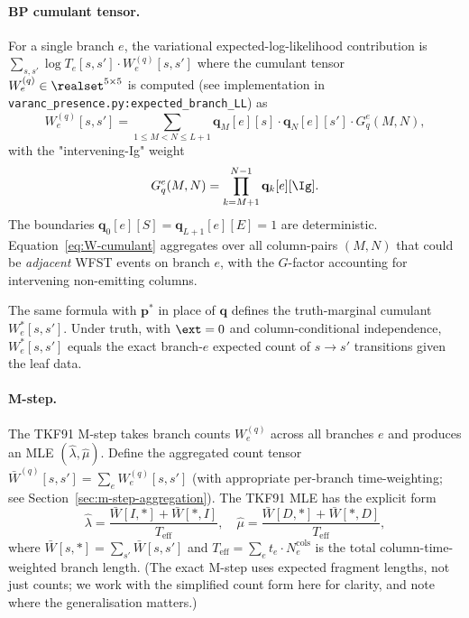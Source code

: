 \paragraph{BP cumulant tensor.}
For a single branch $e$, the variational expected-log-likelihood
contribution is $\sum_{s, s'} \log T_e[s, s'] \cdot W_e^{(q)}[s, s']$
where the cumulant tensor $W_e^{(q)} \in \realset^{5\times 5}$ is
computed (see implementation in
\texttt{varanc\_presence.py:expected\_branch\_LL}) as
\begin{equation}
\label{eq:W-cumulant}
W_e^{(q)}[s, s']
= \sum_{1 \leq M < N \leq L+1} \mathbf{q}_M[e][s] \cdot
   \mathbf{q}_N[e][s'] \cdot G_q^{e}(M, N),
\end{equation}
with the "intervening-Ig" weight
\begin{equation}
G_q^{e}(M, N) = \prod_{k = M+1}^{N-1} \mathbf{q}_k[e][\Ig].
\end{equation}
The boundaries $\mathbf{q}_0[e][S] = \mathbf{q}_{L+1}[e][E] = 1$ are
deterministic.  Equation~\eqref{eq:W-cumulant} aggregates over all
column-pairs $(M, N)$ that could be \emph{adjacent} WFST events
on branch $e$, with the $G$-factor accounting for intervening
non-emitting columns.

The same formula with $\mathbf{p}^*$ in place of $\mathbf{q}$ defines
the truth-marginal cumulant $W_e^{*}[s, s']$.  Under truth, with
$\ext = 0$ and column-conditional independence, $W_e^*[s, s']$
equals the exact branch-$e$ expected count of $s \to s'$
transitions given the leaf data.

\paragraph{M-step.}
The TKF91 M-step takes branch counts $W_e^{(q)}$ across all
branches $e$ and produces an MLE $(\hat\lambda, \hat\mu)$.  Define
the aggregated count tensor $\bar W^{(q)}[s, s'] = \sum_e
W_e^{(q)}[s, s']$ (with appropriate per-branch time-weighting; see
Section~\ref{sec:m-step-aggregation}).  The TKF91 MLE has the
explicit form
\begin{equation}
\label{eq:tkf91-mle}
\hat\lambda = \frac{\bar W[I,*] + \bar W[*,I]}{T_{\text{eff}}},
\quad
\hat\mu = \frac{\bar W[D,*] + \bar W[*,D]}{T_{\text{eff}}},
\end{equation}
where $\bar W[s, *] = \sum_{s'} \bar W[s, s']$ and $T_{\text{eff}}
= \sum_e t_e \cdot N_e^{\text{cols}}$ is the total
column-time-weighted branch length.  (The exact M-step uses
expected fragment lengths, not just counts; we work with the
simplified count form here for clarity, and note where the
generalisation matters.)

